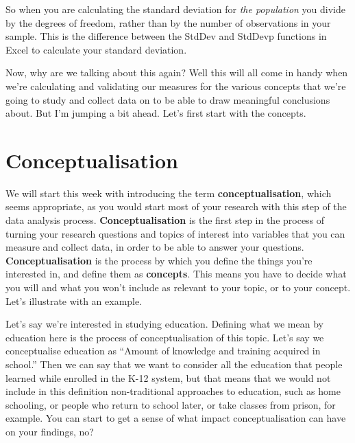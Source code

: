 \documentclass[]{book}
\theoremstyle{definition}
\theoremstyle{definition}
\theoremstyle{definition}
\theoremstyle{remark}
\begin{document}
So when you are calculating the standard deviation for \emph{the
population} you divide by the degrees of freedom, rather than by the
number of observations in your sample. This is the difference between
the StdDev and StdDevp functions in Excel to calculate your standard
deviation.

Now, why are we talking about this again? Well this will all come in
handy when we're calculating and validating our measures for the various
concepts that we're going to study and collect data on to be able to
draw meaningful conclusions about. But I'm jumping a bit ahead. Let's
first start with the concepts.

\hypertarget{conceptualisation}{%
\section{Conceptualisation}\label{conceptualisation}}

We will start this week with introducing the term
\textbf{conceptualisation}, which seems appropriate, as you would start
most of your research with this step of the data analysis process.
\textbf{Conceptualisation} is the first step in the process of turning
your research questions and topics of interest into variables that you
can measure and collect data, in order to be able to answer your
questions. \textbf{Conceptualisation} is the process by which you define
the things you're interested in, and define them as \textbf{concepts}.
This means you have to decide what you will and what you won't include
as relevant to your topic, or to your concept. Let's illustrate with an
example.

Let's say we're interested in studying education. Defining what we mean
by education here is the process of conceptualisation of this topic.
Let's say we conceptualise education as ``Amount of knowledge and
training acquired in school.'' Then we can say that we want to consider
all the education that people learned while enrolled in the K-12 system,
but that means that we would not include in this definition
non-traditional approaches to education, such as home schooling, or
people who return to school later, or take classes from prison, for
example. You can start to get a sense of what impact conceptualisation
can have on your findings, no?
\end{document}
